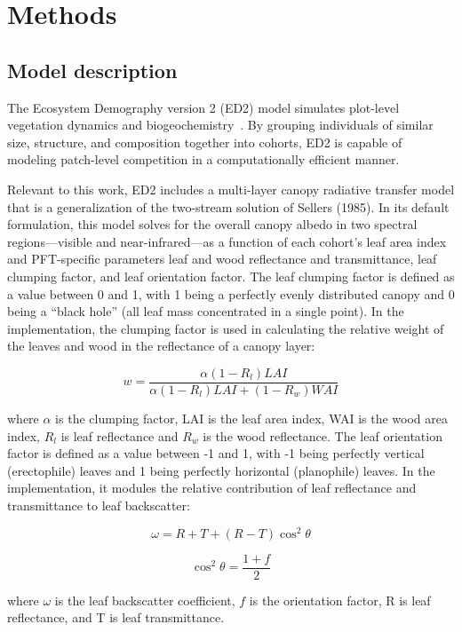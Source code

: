 \section{Methods}

\subsection{Model description}

The Ecosystem Demography version 2 (ED2) model simulates plot-level vegetation dynamics and biogeochemistry~\cite{Moorcroft_2001_ED,Medvigy_2009_ED2}.
By grouping individuals of similar size, structure, and composition together into cohorts, ED2 is capable of modeling patch-level competition in a computationally efficient manner.

Relevant to this work, ED2 includes a multi-layer canopy radiative transfer model that is a generalization of the two-stream solution of Sellers (1985). \nocite{SELLERS_1985_canopy}
In its default formulation, this model solves for the overall canopy albedo in two spectral regions---visible and near-infrared---as a function of each cohort's leaf area index and PFT-specific parameters leaf and wood reflectance and transmittance, leaf clumping factor, and leaf orientation factor.
The leaf clumping factor is defined as a value between 0 and 1, with 1 being a perfectly evenly distributed canopy and 0 being a ``black hole'' (all leaf mass concentrated in a single point).
In the implementation, the clumping factor is used in calculating the relative weight of the leaves and wood in the reflectance of a canopy layer:

\[
  w = \frac{\alpha (1 - R_l) LAI}{\alpha (1 - R_l) LAI + (1 - R_w) WAI}
\]

where $\alpha$ is the clumping factor, LAI is the leaf area index, WAI is the wood area index, $R_l$ is leaf reflectance and $R_w$ is the wood reflectance.
The leaf orientation factor is defined as a value between -1 and 1, with -1 being perfectly vertical (erectophile) leaves and 1 being perfectly horizontal (planophile) leaves.
In the implementation, it modules the relative contribution of leaf reflectance and transmittance to leaf backscatter:

\[
  \omega = R + T + (R - T) \cos^2 \theta
\]

\[
  \cos^2 \theta = \frac{1 + f}{2}
\]

where $\omega$ is the leaf backscatter coefficient, $f$ is the orientation factor, R is leaf reflectance, and T is leaf transmittance.

